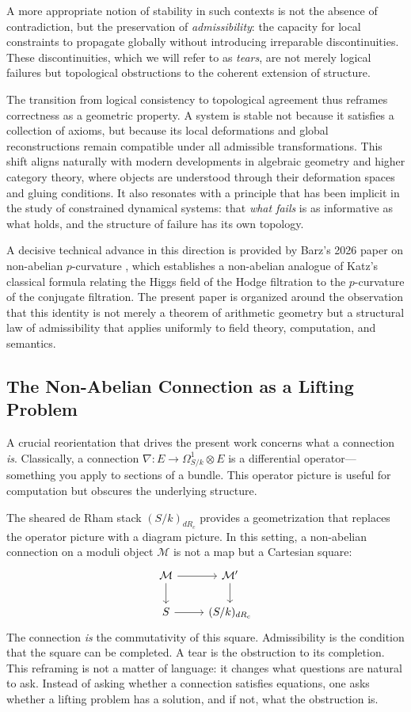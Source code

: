 \documentclass[12pt]{article}
\begin{document}
A more appropriate notion of stability in such contexts is not the absence of
contradiction, but the preservation of \emph{admissibility}: the capacity for local
constraints to propagate globally without introducing irreparable discontinuities.
These discontinuities, which we will refer to as \emph{tears}, are not merely logical
failures but topological obstructions to the coherent extension of structure.

The transition from logical consistency to topological agreement thus reframes
correctness as a geometric property. A system is stable not because it satisfies a
collection of axioms, but because its local deformations and global reconstructions
remain compatible under all admissible transformations. This shift aligns naturally
with modern developments in algebraic geometry and higher category theory, where
objects are understood through their deformation spaces and gluing conditions. It also
resonates with a principle that has been implicit in the study of constrained dynamical
systems: that \emph{what fails} is as informative as what holds, and the structure of
failure has its own topology.

A decisive technical advance in this direction is provided by Barz's 2026 paper on
non-abelian $p$-curvature \cite{barz}, which establishes a non-abelian analogue of
Katz's classical formula \cite{katz} relating the Higgs field of the Hodge filtration
to the $p$-curvature of the conjugate filtration. The present paper is organized around
the observation that this identity is not merely a theorem of arithmetic geometry but a
structural law of admissibility that applies uniformly to field theory, computation,
and semantics.

\subsection{The Non-Abelian Connection as a Lifting Problem}

A crucial reorientation that drives the present work concerns what a connection
\emph{is}. Classically, a connection $\nabla : E \to \Omega^1_{S/k} \otimes E$ is a
differential operator---something you apply to sections of a bundle. This operator
picture is useful for computation but obscures the underlying structure.

The sheared de Rham stack $(S/k)_{dR_c}$ provides a geometrization that replaces the
operator picture with a diagram picture. In this setting, a non-abelian connection on a
moduli object $\mathcal{M}$ is not a map but a Cartesian square:
\[
\begin{tikzcd}
\mathcal{M} \arrow[r] \arrow[d] & \mathcal{M}' \arrow[d] \\
S \arrow[r] & (S/k)_{dR_c}
\end{tikzcd}
\]
The connection \emph{is} the commutativity of this square. Admissibility is the
condition that the square can be completed. A tear is the obstruction to its
completion. This reframing is not a matter of language: it changes what questions are
natural to ask. Instead of asking whether a connection satisfies equations, one asks
whether a lifting problem has a solution, and if not, what the obstruction is.
\end{document}
